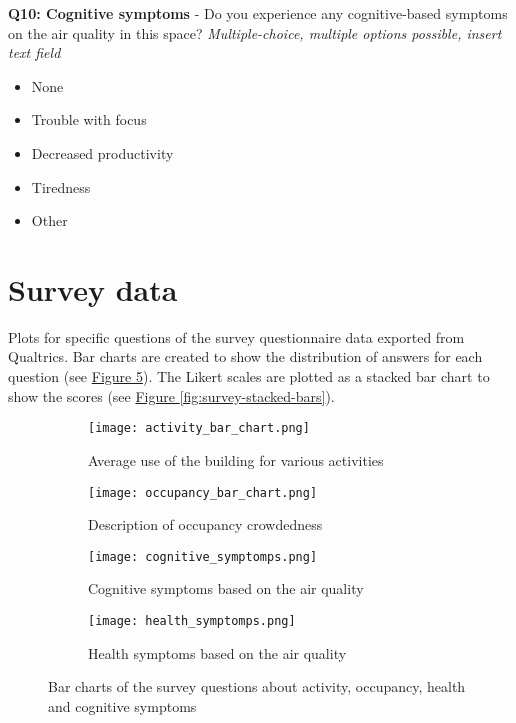 \begin{appendices}
\textbf{Q10: Cognitive symptoms} - Do you experience any cognitive-based symptoms on the air quality in this space? \textit{Multiple-choice, multiple options possible, insert text field}

\begin{itemize}
    \item None
    \item Trouble with focus
    \item Decreased productivity
    \item Tiredness
    \item Other
\end{itemize}


\section{Survey data}
\label{appendix:survey-data}

Plots for specific questions of the survey questionnaire data exported from Qualtrics. Bar charts are created to show the distribution of answers for each question (see \hyperref[fig:survey-bar-charts]{Figure \ref{fig:survey-bar-charts}}). The Likert scales are plotted as a stacked bar chart to show the scores (see \hyperref[fig:survey-stacked-Bars]{Figure \ref{fig:survey-stacked-bars}}).

\begin{figure}[htbp]
    \centering
    \begin{subfigure}{0.4\textwidth}
        \centering
        \texttt{[image: activity\_bar\_chart.png]}
        \caption{Average use of the building for various activities}
        \label{fig:survey_building}
    \end{subfigure}
    \hfill
    \begin{subfigure}{0.4\textwidth}
        \centering
        \texttt{[image: occupancy\_bar\_chart.png]}
        \caption{Description of occupancy crowdedness}
        \label{fig:survey-occupancy}
    \end{subfigure}
    \begin{subfigure}{0.4\textwidth}
        \centering
        \texttt{[image: cognitive\_symptomps.png]}
        \caption{Cognitive symptoms based on the air quality}
        \label{fig:survey-cognitive}
    \end{subfigure}
    \hfill
    \begin{subfigure}{0.4\textwidth}
        \centering
        \texttt{[image: health\_symptomps.png]}
        \caption{Health symptoms based on the air quality}
        \label{fig:survey-health}
    \end{subfigure}    
    \caption{Bar charts of the survey questions about activity, occupancy, health and cognitive symptoms}
    \label{fig:survey-bar-charts}
\end{figure}


\end{appendices}
